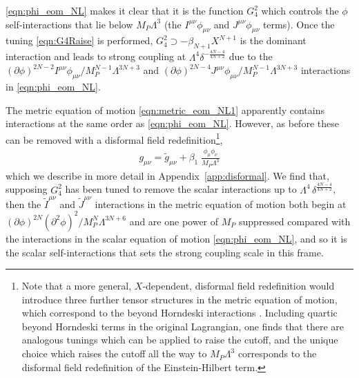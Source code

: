 \documentclass[11pt]{article}
\begin{document}
\eqref{eqn:phi_eom_NL} makes it clear that it is the function $G_4^2$ which controls the $\phi$ self-interactions that lie below $M_P \Lambda^3$ (the $I^{\mu\nu} \phi_{\mu\nu}$ and $J^{\mu\nu} \phi_{\mu\nu}$ terms).
Once the tuning \eqref{eqn:G4Raise} is performed, $G_4^2 \supset -\beta_{N+1} X^{N+1}$ is the dominant interaction and leads to strong coupling at $\Lambda^4 \delta^{- \frac{4N-4}{4N+2} }$ due  to the $(\partial \phi)^{2N-2} I^{\mu\nu} \phi_{\mu\nu} / M_P^{N-1} \Lambda^{3N+3}$ and $(\partial \phi)^{2N-4} J^{\mu\nu} \phi_{\mu\nu} / M_P^{N-1} \Lambda^{3N+3}$ interactions in \eqref{eqn:phi_eom_NL}.

The metric equation of motion \eqref{eqn:metric_eom_NL1} apparently contains interactions at the same order as \eqref{eqn:phi_eom_NL}. 
However, as before these can be removed with a disformal field redefinition\footnote{
Note that a more general, $X$-dependent, disformal field redefinition would introduce three further tensor structures in the metric equation of motion, which correspond to the beyond Horndeski interactions \cite{Gleyzes:2014dya, Gleyzes:2014qga, Crisostomi:2016tcp}. Including quartic beyond Horndeski terms in the original Lagrangian, one finds that there are analogous tunings which can be applied to raise the cutoff, and the unique choice which raises the cutoff all the way to $M_P \Lambda^3$ corresponds to the disformal field redefinition of the Einstein-Hilbert term. 
},
\begin{align}
 g_{\mu\nu} = \tilde{g}_{\mu\nu} + \beta_1 \;  \frac{ \phi_\mu \phi_\nu}{ M_P \Lambda^3} 
\label{eqn:dis_redef_NL}
\end{align}
which we describe in more detail in Appendix~\ref{app:disformal}. We find that, supposing $G_4^2$ has been tuned to remove the scalar interactions up to $\Lambda^4 \, \delta^{\frac{4N-4}{4N+2}}$, 
then the $\tilde{I}^{\mu\nu}$ and $\tilde{J}^{\mu\nu}$ interactions in the metric equation of motion both begin at $(\partial \phi)^{2N} ( \partial^2 \phi )^2 / M_P^{N} \Lambda^{3N+ 6}$ and
are one power of $M_P$ suppressed compared with the interactions in the scalar equation of motion \eqref{eqn:phi_eom_NL}, and so it is the scalar self-interactions that sets the strong coupling scale in this frame. 


\end{document}
